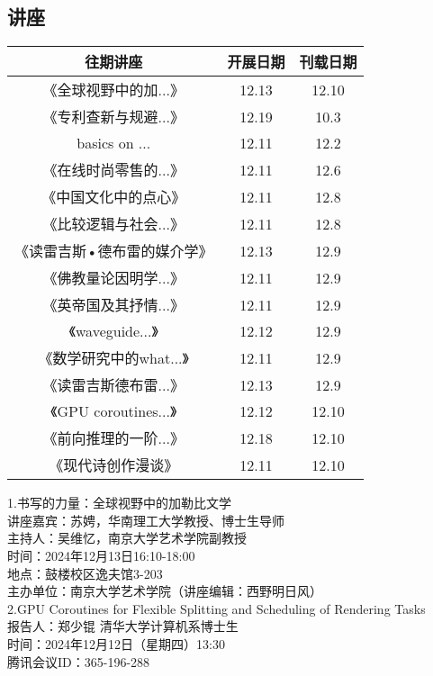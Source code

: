\documentclass[letterpaper, 12pt]{article}
\begin{document}
\begin{multicols}{2}

\section{讲座}
\begin{tabular}{|c|c|c|}
    \hline
    往期讲座 & 开展日期 & 刊载日期\\
    \hline\hline
    《全球视野中的加...》& 12.13 & 12.10\\
    《专利查新与规避...》 & 12.19 & 10.3\\
    basics on ... & 12.11 & 12.2\\
    《在线时尚零售的...》 & 12.11 & 12.6\\
    《中国文化中的点心》& 12.11 & 12.8\\
    《比较逻辑与社会...》 & 12.11 & 12.8\\
    《读雷吉斯•德布雷的媒介学》 & 12.13 & 12.9\\
    《佛教量论因明学...》 & 12.11 & 12.9\\
    《英帝国及其抒情...》 & 12.11 & 12.9\\
    《waveguide...》 & 12.12 & 12.9\\
    《数学研究中的what...》 & 12.11 & 12.9\\
    《读雷吉斯德布雷...》 & 12.13 & 12.9\\
    《GPU coroutines...》 & 12.12 & 12.10\\
    《前向推理的一阶...》 & 12.18 & 12.10\\
    《现代诗创作漫谈》 & 12.11 & 12.10\\
    \hline
\end{tabular}

1.书写的力量：全球视野中的加勒比文学\\
讲座嘉宾：苏娉，华南理工大学教授、博士生导师\\
主持人：吴维忆，南京大学艺术学院副教授\\
时间：2024年12月13日16:10-18:00\\
地点：鼓楼校区逸夫馆3-203\\
主办单位：南京大学艺术学院（讲座编辑：西野明日风）\\

2.GPU Coroutines for Flexible Splitting and Scheduling of Rendering Tasks\\
报告人：郑少锟 清华大学计算机系博士生\\
时间：2024年12月12日（星期四）13:30\\
腾讯会议ID：365-196-288\\


\end{multicols}
\end{document}
